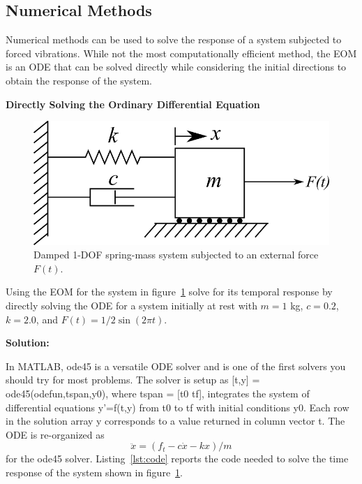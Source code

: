 \documentclass[12pt,letter]{article}
\begin{document}
	\subsection{Numerical Methods}
	
		Numerical methods can be used to solve the response of a system subjected to forced vibrations. While not the most computationally efficient method, the EOM is an ODE that can be solved directly while considering the initial directions to obtain the response of the system. 

\begin{example}
	\textbf{Directly Solving the Ordinary Differential Equation}
	
	\begin{figure}[H]
		\centering
		\includegraphics[]{../figures/1-DOF-spring_dashpot_mass_horizontal_forced.png}
		\caption{Damped 1-DOF spring-mass system subjected to an external force $F(t)$.}
		\label{fig:2-DOF-spring_mass_horizontal_3}
	\end{figure}
	
	
	Using the EOM for the system in figure~\ref{fig:2-DOF-spring_mass_horizontal_3} solve for its temporal response by directly solving the ODE for a system initially at rest with $m=1$ kg, $c=0.2$, $k=2.0$, and $F(t)=1/2 \sin (2 \pi t)$. 
	
	\noindent \textbf{Solution:} 
	
	
	In MATLAB, {\ttfamily{}ode45} is a versatile ODE solver and is one of the first solvers you should try for most problems. The solver is setup as {\ttfamily{}[t,y] = ode45(odefun,tspan,y0),} where {\ttfamily{}tspan = [t0 tf],} integrates the system of differential equations {\ttfamily{}y'=f(t,y)} from {\ttfamily{}t0} to {\ttfamily{}tf} with initial conditions {\ttfamily{}y0}. Each row in the solution array y corresponds to a value returned in column vector {\ttfamily{}t}. The ODE is re-organized as 
	\begin{equation}
	\ddot{x} = (f_t - c  \dot{x} - k  x) / m
	\end{equation}
	for the {\ttfamily{}ode45} solver. Listing~\ref{lst:code} reports the code needed to solve the time response of the system shown in figure~\ref{fig:2-DOF-spring_mass_horizontal_3}.


\end{example}
\end{document}
